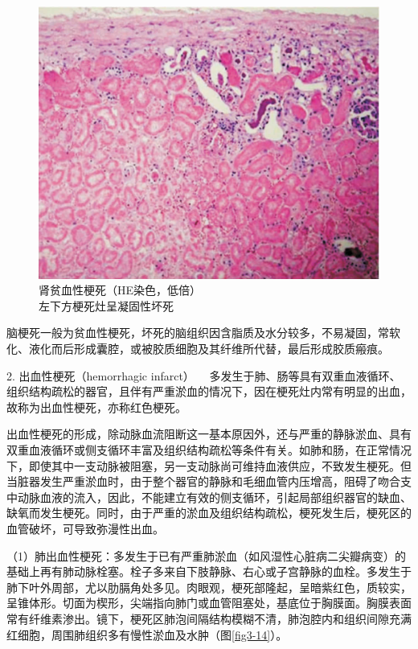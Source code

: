 \begin{figure}[!htbp]
\centering
\includegraphics{./images/Image00047.jpg}
\caption{肾贫血性梗死（HE染色，低倍） \\ {\small 左下方梗死灶呈凝固性坏死}}
\label{fig3-13} 
\end{figure}

脑梗死一般为贫血性梗死，坏死的脑组织因含脂质及水分较多，不易凝固，常软化、液化而后形成囊腔，或被胶质细胞及其纤维所代替，最后形成胶质瘢痕。

{2. 出血性梗死（hemorrhagic infarct）}
　多发生于肺、肠等具有双重血液循环、组织结构疏松的器官，且伴有严重淤血的情况下，因在梗死灶内常有明显的出血，故称为出血性梗死，亦称红色梗死。

出血性梗死的形成，除动脉血流阻断这一基本原因外，还与严重的静脉淤血、具有双重血液循环或侧支循环丰富及组织结构疏松等条件有关。如肺和肠，在正常情况下，即使其中一支动脉被阻塞，另一支动脉尚可维持血液供应，不致发生梗死。但当脏器发生严重淤血时，由于整个器官的静脉和毛细血管内压增高，阻碍了吻合支中动脉血液的流入，因此，不能建立有效的侧支循环，引起局部组织器官的缺血、缺氧而发生梗死。同时，由于严重的淤血及组织结构疏松，梗死发生后，梗死区的血管破坏，可导致弥漫性出血。

（1）肺出血性梗死：多发生于已有严重肺淤血（如风湿性心脏病二尖瓣病变）的基础上再有肺动脉栓塞。栓子多来自下肢静脉、右心或子宫静脉的血栓。多发生于肺下叶外周部，尤以肋膈角处多见。肉眼观，梗死部隆起，呈暗紫红色，质较实，呈锥体形。切面为楔形，尖端指向肺门或血管阻塞处，基底位于胸膜面。胸膜表面常有纤维素渗出。镜下，梗死区肺泡间隔结构模糊不清，肺泡腔内和组织间隙充满红细胞，周围肺组织多有慢性淤血及水肿（图\ref{fig3-14}）。

